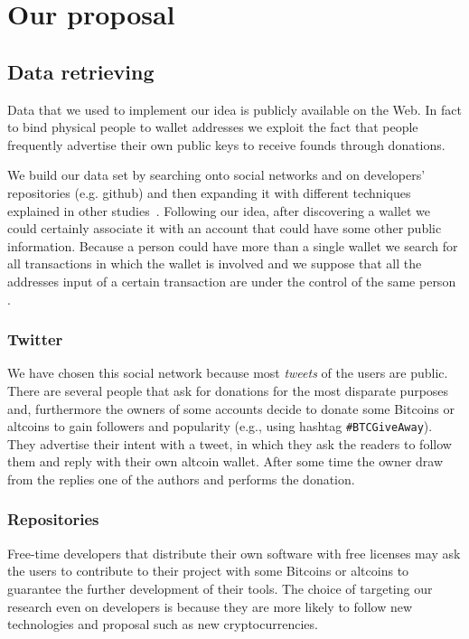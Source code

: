 \section{Our proposal}

\subsection{Data retrieving}
Data that we used to implement our idea is publicly available on the Web. In
fact to bind physical people to wallet addresses we exploit the fact that
people frequently advertise their own public keys to receive founds
through donations.

We build our data set by searching onto social networks and on developers'
repositories (e.g. github) and then expanding it with different techniques
explained in other studies~\cite{fistful}. Following our idea, after discovering
a wallet we could certainly associate it with an account that could have some
other public information. Because a person could have more than a single wallet
we search for all transactions in which the wallet is involved and we suppose
that all the addresses input of a certain transaction are under the control of
the same person \cite{satoshi} \cite{deanon} \cite{fistful}.

\subsubsection*{Twitter}
We have chosen this social network because most \textit{tweets} of the users are
public. There are several people that ask for donations for the most disparate
purposes and, furthermore the owners of some accounts decide to donate some
Bitcoins or altcoins to gain followers and popularity (e.g., using hashtag
\texttt{\#BTCGiveAway}). They advertise their intent with a tweet, in which
they ask the readers to follow them and reply with their own altcoin wallet.
After some time the owner draw from the replies one of the authors and performs
the donation.

\subsubsection*{Repositories}
Free-time developers that distribute their own software with free licenses may
ask the users to contribute to their project with some Bitcoins or altcoins to
guarantee the further development of their tools. The choice of targeting our
research even on developers is because they are more likely to follow new
technologies and proposal such as new cryptocurrencies. 

